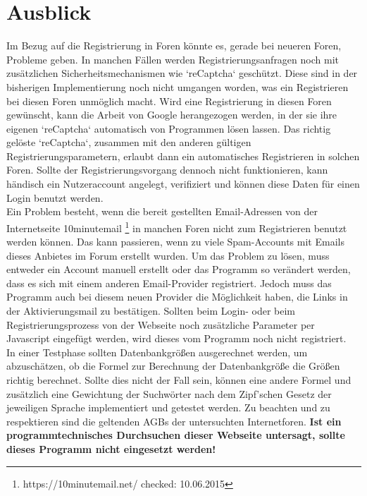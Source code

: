 \section{Ausblick}
Im Bezug auf die Registrierung in Foren könnte es, gerade bei neueren Foren, Probleme geben. In manchen Fällen werden Registrierungsanfragen noch mit zusätzlichen Sicherheitsmechanismen wie `reCaptcha` geschützt. Diese sind in der bisherigen Implementierung noch nicht umgangen worden, was ein Registrieren bei diesen Foren unmöglich macht. Wird eine Registrierung in diesen Foren gewünscht, kann die Arbeit von Google herangezogen werden, in der sie ihre eigenen `reCaptcha` automatisch von Programmen lösen lassen\cite{goodfellow2013multi}. Das richtig gelöste `reCaptcha`, zusammen mit den anderen gültigen Registrierungsparametern, erlaubt dann ein automatisches Registrieren in solchen Foren. Sollte der Registrierungsvorgang dennoch nicht funktionieren, kann händisch ein Nutzeraccount angelegt, verifiziert und können diese Daten für einen Login benutzt werden.\\
Ein Problem besteht, wenn die bereit gestellten Email-Adressen von der Internetseite 10minutemail \footnote{https://10minutemail.net/ checked: 10.06.2015} in manchen Foren nicht zum Registrieren benutzt werden können. Das kann passieren, wenn zu viele Spam-Accounts mit Emails dieses Anbietes im Forum erstellt wurden. Um das Problem zu lösen, muss entweder ein Account manuell erstellt oder das Programm so verändert werden, dass es sich mit einem anderen Email-Provider registriert. Jedoch muss das Programm auch bei diesem neuen Provider die Möglichkeit haben, die Links in der Aktivierungsmail zu bestätigen.
Sollten beim Login- oder beim Registrierungsprozess von der Webseite noch zusätzliche Parameter per Javascript eingefügt werden, wird dieses vom Programm noch nicht registriert.\\
In einer Testphase sollten Datenbankgrößen ausgerechnet werden, um abzuschätzen, ob die Formel zur Berechnung der Datenbankgröße die Größen richtig berechnet. Sollte dies nicht der Fall sein, können eine andere Formel und zusätzlich eine Gewichtung der Suchwörter nach dem Zipf'schen Gesetz \cite{leopold2002zipfsche} der jeweiligen Sprache implementiert und getestet werden\cite{jiang2009selectivity}.
Zu beachten und zu respektieren sind die geltenden AGBs der untersuchten Internetforen. \textbf{Ist ein programmtechnisches Durchsuchen dieser Webseite untersagt, sollte dieses Programm nicht eingesetzt werden!}

